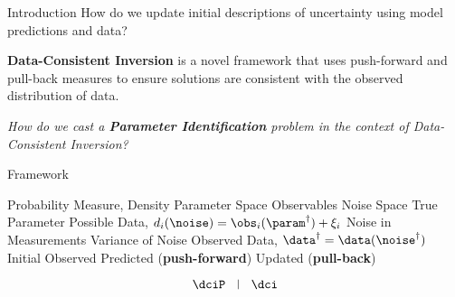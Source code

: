 \begin{block}{Introduction}
\centering
            {\large How do we update initial descriptions of uncertainty using model predictions and data?}

             {\large \textbf{Data-Consistent Inversion} is a novel framework that uses push-forward and pull-back measures to ensure solutions are consistent with the observed distribution of data.}

             {\large \emph{How do we cast a \textbf{Parameter Identification} problem in the context of Data-Consistent Inversion?} }

\end{block}

\begin{block}{Framework}
\large
    \begin{itemize}
        \itembox{$ \PP, \; \pi $} Probability Measure, Density
         Parameter Space
         Observables
         Noise Space
        \itembox{$\param^\dagger\in\pspace$} True Parameter
         Possible Data, $d_i(\noise) = \obs_i(\param^\dagger) + \xi_i$
        \itembox{$\noise^\dagger\in\nspace$} Noise in Measurements
         Variance of Noise
         Observed Data, $\data^\dagger = \data(\noise^\dagger)$
        \itembox{$ \initialP, \; \initial $} Initial
        \itembox{$ \observedP, \; \observed $} Observed
        \itembox{$ \predictedP, \; \predicted $} Predicted (\textbf{push-forward})
        \itembox{$ \updatedP, \; \updated $} Updated (\textbf{pull-back})
    \end{itemize}
\centering
\vspace{1cm}
    \begin{equation*}
            \dciP \quad \vline \quad \dci
    \end{equation*}

\end{block}

